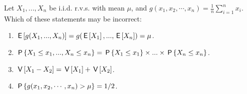 \documentclass[poll_tutorial_format]{subfiles}
\begin{document}
	
	
	\begin{exercise}
		Let $X_1, . . . ,X_n$ be i.i.d. r.v.s. with mean $\mu$, and $g(x_1, x_2, \cdots, x_n) =\frac{1}{n}\sum_{i=1}^n x_i$. 
		Which of these statements may be incorrect:
		\begin{enumerate}
			\item $\E{g(X_1, . . . ,X_n)}=g(\E{X_1}, . . . ,\E{X_n}) =\mu$.
			\item $\P{X_1\leq x_1, . . . ,X_n\leq x_n}=\P{X_1\leq x_1}\times  . . . \times \P{X_n\leq x_n}$.
			\item $\V{X_1 -X_2}=\V{X_1}+\V{X_2}$.
			\item $\P{g(x_1, x_2, \cdots, x_n) >\mu} =1/2 $.
		\end{enumerate}
	\end{exercise}
	
	
	
	 
	
	
	
\end{document}
